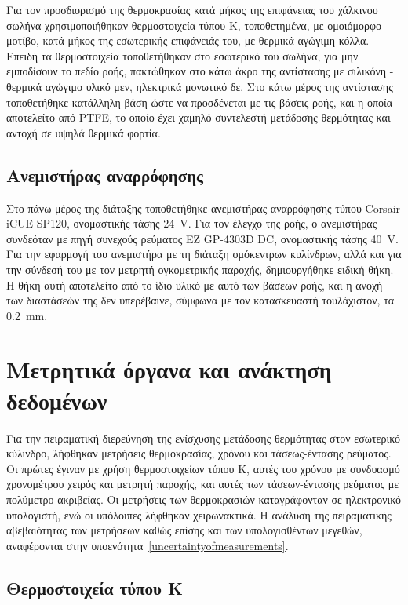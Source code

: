 Για τον προσδιορισμό της θερμοκρασίας κατά μήκος της επιφάνειας του χάλκινου σωλήνα χρησιμοποιήθηκαν θερμοστοιχεία τύπου Κ, τοποθετημένα, με ομοιόμορφο μοτίβο, κατά μήκος της εσωτερικής επιφάνειάς του, με θερμικά αγώγιμη κόλλα. Επειδή τα θερμοστοιχεία τοποθετήθηκαν στο εσωτερικό του σωλήνα, για μην εμποδίσουν το πεδίο ροής, πακτώθηκαν στο κάτω άκρο της αντίστασης με σιλικόνη - θερμικά αγώγιμο υλικό μεν, ηλεκτρικά μονωτικό δε. Στο κάτω μέρος της αντίστασης τοποθετήθηκε κατάλληλη βάση ώστε να προσδένεται με τις βάσεις ροής, και η οποία αποτελείτο από PTFE, το οποίο έχει χαμηλό συντελεστή μετάδοσης θερμότητας και αντοχή σε υψηλά θερμικά φορτία.

\subsection{Ανεμιστήρας αναρρόφησης}

\noindent Στο πάνω μέρος της διάταξης τοποθετήθηκε ανεμιστήρας αναρρόφησης τύπου Corsair iCUE SP120, ονομαστικής τάσης \qty{24}{\volt}. Για τον έλεγχο της ροής, ο ανεμιστήρας συνδεόταν με πηγή συνεχούς ρεύματος EZ GP-4303D DC, ονομαστικής τάσης \qty{40}{\volt}. Για την εφαρμογή του ανεμιστήρα με τη διάταξη ομόκεντρων κυλίνδρων, αλλά και για την σύνδεσή του με τον μετρητή ογκομετρικής παροχής, δημιουργήθηκε ειδική θήκη. Η θήκη αυτή αποτελείτο από το ίδιο υλικό με αυτό των βάσεων ροής, και η ανοχή των διαστάσεών της δεν υπερέβαινε, σύμφωνα με τον κατασκευαστή τουλάχιστον, τα \qty{0.2}{\milli\metre}.

\section{Μετρητικά όργανα και ανάκτηση δεδομένων}

\noindent Για την πειραματική διερεύνηση της ενίσχυσης μετάδοσης θερμότητας στον εσωτερικό κύλινδρο, λήφθηκαν μετρήσεις θερμοκρασίας, χρόνου και τάσεως-έντασης ρεύματος. Οι πρώτες έγιναν με χρήση θερμοστοιχείων τύπου Κ, αυτές του χρόνου με συνδυασμό χρονομέτρου χειρός και μετρητή παροχής, και αυτές των τάσεων-έντασης ρεύματος με πολύμετρο ακριβείας. Οι μετρήσεις των θερμοκρασιών καταγράφονταν σε ηλεκτρονικό υπολογιστή, ενώ οι υπόλοιπες λήφθηκαν χειρωνακτικά. Η ανάλυση της πειραματικής αβεβαιότητας των μετρήσεων καθώς επίσης και των υπολογισθέντων μεγεθών, αναφέρονται στην υποενότητα~\ref{uncertaintyofmeasurements}.

\subsection{Θερμοστοιχεία τύπου Κ}

